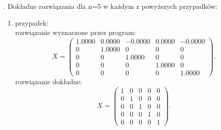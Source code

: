 \documentclass[12pt]{article}
\begin{document}
\newpage
.
\newpage
Dok\l{}adne rozwi\k{a}zania dla n=5 w ka\.zdym z powy\.zszych przypadk\'ow:
\begin{enumerate}
\item przypadek:
\\
rozwi\k{a}zanie wyznaczone przez program:
\[
X=\begin{pmatrix}
1.0000 & 0.0000 & -0.0000 & 0.0000 & -0.0000 \\
0 & 1.0000 & 0 & 0 & 0 \\
0 & 0 & 1.0000 & 0 & 0 \\
0 & 0 & 0 & 1.0000 & 0 \\
0 & 0 & 0 & 0 & 1.0000
\end{pmatrix}.
\]
rozwi\k{a}zanie dok\l{}adne:
\[
X=\begin{pmatrix}
1 & 0 & 0 & 0 & 0 \\
0 & 1 & 0 & 0 & 0 \\
0 & 0 & 1 & 0 & 0 \\
0 & 0 & 0 & 1 & 0 \\
0 & 0 & 0 & 0 & 1
\end{pmatrix}.
\]


\end{enumerate}
\end{document}

